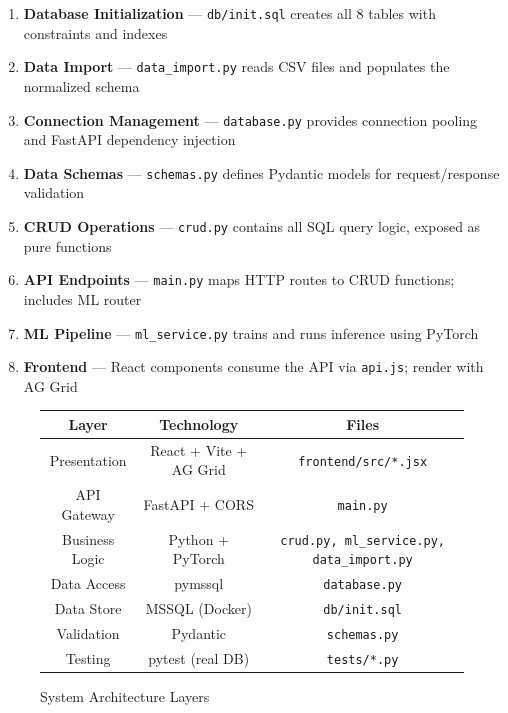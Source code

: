 \documentclass[12pt,a4paper]{article}
\begin{document}
\begin{enumerate}[nosep]
    \item \textbf{Database Initialization} — \texttt{db/init.sql} creates all 8 tables with constraints and indexes
    \item \textbf{Data Import} — \texttt{data\_import.py} reads CSV files and populates the normalized schema
    \item \textbf{Connection Management} — \texttt{database.py} provides connection pooling and FastAPI dependency injection
    \item \textbf{Data Schemas} — \texttt{schemas.py} defines Pydantic models for request/response validation
    \item \textbf{CRUD Operations} — \texttt{crud.py} contains all SQL query logic, exposed as pure functions
    \item \textbf{API Endpoints} — \texttt{main.py} maps HTTP routes to CRUD functions; includes ML router
    \item \textbf{ML Pipeline} — \texttt{ml\_service.py} trains and runs inference using PyTorch
    \item \textbf{Frontend} — React components consume the API via \texttt{api.js}; render with AG Grid
\end{enumerate}

\begin{figure}[h]
\centering
\begin{tabular}{|c|c|c|}
\hline
\textbf{Layer} & \textbf{Technology} & \textbf{Files} \\
\hline
Presentation & React + Vite + AG Grid & \texttt{frontend/src/*.jsx} \\
\hline
API Gateway & FastAPI + CORS & \texttt{main.py} \\
\hline
Business Logic & Python + PyTorch & \texttt{crud.py, ml\_service.py, data\_import.py} \\
\hline
Data Access & pymssql & \texttt{database.py} \\
\hline
Data Store & MSSQL (Docker) & \texttt{db/init.sql} \\
\hline
Validation & Pydantic & \texttt{schemas.py} \\
\hline
Testing & pytest (real DB) & \texttt{tests/*.py} \\
\hline
\end{tabular}
\caption{System Architecture Layers}
\end{figure}

\end{document}
